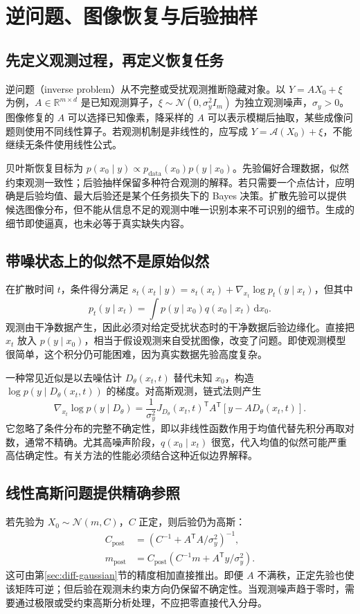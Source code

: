 \documentclass[UTF8,12pt,a4paper,fontset=fandol]{ctexart}
\begin{document}
\section{逆问题、图像恢复与后验抽样}
\label{sec:diff-inverse}
\subsection{先定义观测过程，再定义恢复任务}
逆问题（inverse problem）从不完整或受扰观测推断隐藏对象。以 $Y=AX_0+\xi$ 为例，$A\in\mathbb R^{m\times d}$ 是已知观测算子，$\xi\sim\mathcal N(0,\sigma_y^2I_m)$ 为独立观测噪声，$\sigma_y>0$。图像修复的 $A$ 可以选择已知像素，降采样的 $A$ 可以表示模糊后抽取，某些成像问题则使用不同线性算子。若观测机制是非线性的，应写成 $Y=\mathcal A(X_0)+\xi$，不能继续无条件使用线性公式。

贝叶斯恢复目标为 $p(x_0\mid y)\propto p_{\mathrm{data}}(x_0)p(y\mid x_0)$。先验偏好合理数据，似然约束观测一致性；后验抽样保留多种符合观测的解释。若只需要一个点估计，应明确是后验均值、最大后验还是某个任务损失下的 Bayes 决策。扩散先验可以提供候选图像分布，但不能从信息不足的观测中唯一识别本来不可识别的细节。生成的细节即使逼真，也未必等于真实缺失内容。

\subsection{带噪状态上的似然不是原始似然}
在扩散时间 $t$，条件得分满足 $s_t(x_t\mid y)=s_t(x_t)+\nabla_{x_t}\log p_t(y\mid x_t)$，但其中
\begin{equation}
 p_t(y\mid x_t)=\int p(y\mid x_0)q(x_0\mid x_t)\,\mathrm dx_0.
 \label{eq:diff-noisy-likelihood}
\end{equation}
观测由干净数据产生，因此必须对给定受扰状态时的干净数据后验边缘化。直接把 $x_t$ 放入 $p(y\mid x_0)$，相当于假设观测来自受扰图像，改变了问题。即使观测模型很简单，这个积分仍可能困难，因为真实数据先验高度复杂。

一种常见近似是以去噪估计 $D_\theta(x_t,t)$ 替代未知 $x_0$，构造 $\log p(y\mid D_\theta(x_t,t))$ 的梯度。对高斯观测，链式法则产生
\[
 \nabla_{x_t}\log p(y\mid D_\theta)=
 \frac1{\sigma_y^2}J_{D_\theta}(x_t,t)^\mathsf T A^\mathsf T[y-AD_\theta(x_t,t)].
\]
它忽略了条件分布的完整不确定性，即以非线性函数作用于均值代替先积分再取对数，通常不精确。尤其高噪声阶段，$q(x_0\mid x_t)$ 很宽，代入均值的似然可能严重高估确定性。有关方法的性能必须结合这种近似边界解释。

\subsection{线性高斯问题提供精确参照}
若先验为 $X_0\sim\mathcal N(m,C)$，$C$ 正定，则后验仍为高斯：
\begin{align}
 C_{\mathrm{post}}&=(C^{-1}+A^\mathsf T A/\sigma_y^2)^{-1},\nonumber\\
 m_{\mathrm{post}}&=C_{\mathrm{post}}(C^{-1}m+A^\mathsf T y/\sigma_y^2).
 \label{eq:diff-linear-inverse}
\end{align}
这可由第\ref{sec:diff-gaussian}节的精度相加直接推出。即便 $A$ 不满秩，正定先验也使该矩阵可逆；但后验在观测未约束方向仍保留不确定性。当观测噪声趋于零时，需要通过极限或受约束高斯分析处理，不应把零直接代入分母。
\end{document}
